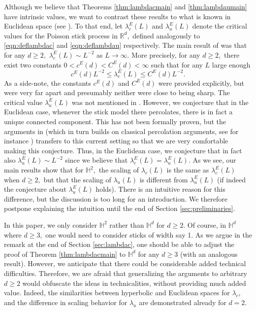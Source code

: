 \documentclass[a4paper,12pt]{article}
\newcommand{\BH}{{\mathbb{H}}}
\newcommand{\BR}{{\mathbb{R}}}
\begin{document}
\medskip






Although we believe that Theorems \ref{thm:lambdacmain} and \ref{thm:lambdaumain} have 
intrinsic values, we want to contrast these results to what is known in Euclidean space
(see \cite{B_22}). To that end, let $\lambda^E_c(L)$ and $\lambda^E_u(L)$ denote the 
critical values for the Poisson stick process in $\BR^d,$ defined analogously to 
\eqref{eqn:deflambdac} and \eqref{eqn:deflambdau}
respectively. The main result of \cite{B_22} 
was that 
for any $d\geq 2,$ $\lambda^E_c(L)\sim L^{-2}$ as $L\to \infty.$ More precisely, for any $ d \geq 2,$ 
there exist two constants $0<c^E(d)<C^E(d)<\infty$ such that for any $L$ large enough 
\[
c^E(d)L^{-2}\leq \lambda^E_c(L) \leq C^E(d) L^{-2}.
\]
As a side-note, the constants $c^E(d)$ and $C^E(d)$ were provided explicitly, but  
were very far apart and presumably neither were close to being sharp.
The critical value $\lambda^E_u(L)$ was not mentioned in \cite{B_22}. However, we conjecture
that in the Euclidean case,  whenever the stick model there percolates, there is in fact a 
unique connected component. This has not been formally proven, but the arguments 
in \cite{MR_96} (which in turn builds on classical percolation arguments, see for 
instance \cite{G_99}) transfers to this current setting so that we are very comfortable 
making this conjecture. Thus, in the Euclidean case, we conjecture that in fact 
also $\lambda^E_u(L)\sim L^{-2}$ since we believe that $\lambda^E_c(L)=\lambda^E_u(L)$. As we see, 
our main results show that for $\BH^2,$ the scaling of $\lambda_c(L)$  is the same as 
$\lambda^E_c(L)$ when $d\geq 2,$ but that the scaling of $\lambda_u(L)$ is different from 
$\lambda^E_u(L)$ (if indeed the conjecture about $\lambda^E_u(L)$ holds). 
There is an intuitive reason for this difference, but the discussion is too long
for an introduction. We therefore postpone explaining the intuition until the end of Section 
\ref{sec:preliminaries}.


In this paper, we only consider $\BH^2$ rather than $\BH^d$ for $d\geq 2.$
Of course, in $\BH^d$ where $d\geq 3,$ one would need to consider sticks of width 
say 1. As we argue in the remark at the end of Section \ref{sec:lambdac}, one should be
able to adjust the proof of Theorem \ref{thm:lambdacmain} to
$\BH^d$ for any $d \geq 3$ (with an analogous result). However, we anticipate that there could 
be considerable added technical difficulties. Therefore,
we are afraid that generalizing the arguments to arbitrary $d\geq 2$ would obfuscate the ideas in
technicalities, without providing much added value. Indeed, the similarities between 
hyperbolic and Euclidean spaces for $\lambda_c$,  and the difference in scaling behavior 
for $\lambda_u$ are demonstrated already for $d=2.$
\end{document}
